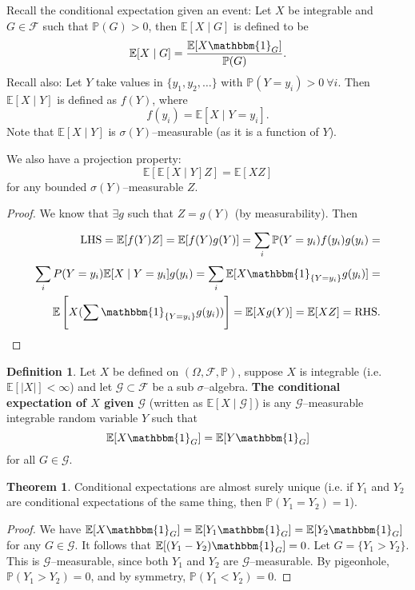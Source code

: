 \documentclass{article}
\theoremstyle{definition}
\newtheorem{theorem}{Theorem}[section]
\newtheorem{defn}{Definition}[section]
\begin{document}
Recall the conditional expectation given an event: Let $X$ be integrable and $G \in \mathcal{F}$ such that $\mathbb{P}(G)>0$, then $\mathbb{E}[X \mid G]$ is defined to be\[
\mathbb{E}[X \mid G] = \frac{\mathbb{E}[X \mathbbm{1}_{G}]}{\mathbb{P}(G)}.
\]
Recall also: Let $Y$ take values in $\{y_1,y_2,\ldots\}$ with $\mathbb{P}(Y=y_i)>0 ~\forall i$. Then $\mathbb{E}[X \mid Y]$ is defined as $f(Y)$, where \[
f(y_i) = \mathbb{E}[X \mid Y=y_i].
\]
Note that $\mathbb{E}[X \mid Y]$ is $\sigma(Y)$--measurable (as it is a function of $Y$).

We also have a projection property: $$\mathbb{E}[\mathbb{E}[X \mid Y]Z]=\mathbb{E}[XZ]$$ for any bounded $\sigma(Y)$--measurable $Z$.

\begin{proof} We know that $\exists g$ such that $Z=g(Y)$ (by measurability). Then
    \begin{align*}
        \text{LHS}=\mathbb{E}[f(Y)Z]=\mathbb{E}[f(Y)g(Y)] = \sum_{i}^{} \mathbb{P}(Y=y_i)f(y_i)g(y_i) = \\
        \sum_{i}^{} P(Y=y_i)\mathbb{E}[X \mid Y=y_i]g(y_i) = \sum_{i}^{} \mathbb{E}[X\mathbbm{1}_{\{Y=y_i\}}g(y_i)] = \\
        \mathbb{E}\left[X(\sum_{}^{} \mathbbm{1}_{\{Y=y_i\}}g(y_i))\right] = \mathbb{E}[Xg(Y)] = \mathbb{E}[XZ] = \text{RHS}.
    \end{align*}
\end{proof}
\begin{defn}
    Let $X$ be defined on $(\Omega, \mathcal{F}, \mathbb{P})$, suppose $X$ is integrable (i.e. $\mathbb{E}[|X|]<\infty$) and let $\mathcal{G} \subset \mathcal{F}$ be a sub $\sigma$--algebra. \textbf{The conditional expectation of $X$ given $\mathcal{G}$}  (written as $\mathbb{E}[X \mid \mathcal{G}]$) is any $\mathcal{G}$--measurable integrable random variable $Y$ such that $$\mathbb{E}[X \mathbbm{1}_G] = \mathbb{E}[Y \mathbbm{1}_G]$$ for all $G \in \mathcal{G}.$
\end{defn}
\begin{theorem}
    Conditional expectations are almost surely unique (i.e. if $Y_1$ and $Y_2$ are conditional expectations of the same thing, then $\mathbb{P}(Y_1=Y_2)=1$).
\end{theorem}
\begin{proof}
    We have $\mathbb{E}[X \mathbbm{1}_G] = \mathbb{E}[Y_1 \mathbbm{1}_G] = \mathbb{E}[Y_2 \mathbbm{1}_G]$ for any $G \in \mathcal{G}$. It follows that $\mathbb{E}[(Y_1-Y_2) \mathbbm{1}_G]= 0$. Let $G=\{Y_1 > Y_2\}$. This is $\mathcal{G}$--measurable, since both $Y_1$ and $Y_2$ are $\mathcal{G}$--measurable. By pigeonhole, $\mathbb{P}(Y_1 > Y_2) = 0$, and by symmetry, $\mathbb{P}(Y_1 < Y_2) = 0$.
\end{proof}
\end{document}

